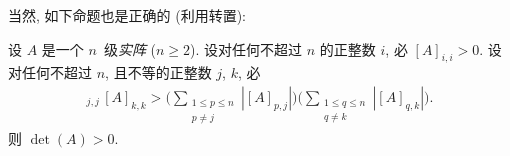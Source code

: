 

当然, 如下命题也是正确的 (利用转置):

\begin{theorem}
    设 \(A\) 是一个 \(n\)~级\emph{实阵} (\(n \geq 2\)).
    设对任何不超过 \(n\) 的正整数 \(i\), 必
    \([A]_{i,i} > 0\).
    设对任何不超过 \(n\), 且不等的正整数 \(j\), \(k\), 必
    \begin{align*}
        [A]_{j,j}\,[A]_{k,k} >
        \Bigg(
        \sum_{\substack{1 \leq p \leq n \\
                p \neq j}} {|[A]_{p,j}|}
        \Bigg)
        \Bigg(
        \sum_{\substack{1 \leq q \leq n \\
                q \neq k}} {|[A]_{q,k}|}
        \Bigg).
    \end{align*}
    则 \(\det {(A)} > 0\).
\end{theorem}

